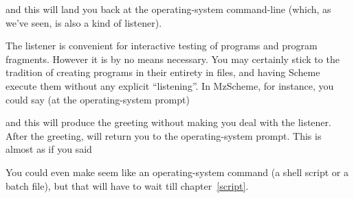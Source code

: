 
\n and this will land you back at the operating-system
command-line (which, as we’ve seen, is also a kind of
listener).

The listener is convenient for interactive testing of
programs and program fragments.  However it is by no
means necessary.  You may certainly stick to the
tradition of creating programs in their entirety in
files, and having Scheme execute them without any
explicit “listening”.  In MzScheme, for instance, you
could say (at the operating-system prompt)


\n and this will produce the greeting without making you
deal with
the listener.   After the greeting,  will
return you to the
operating-system prompt.  This is almost as if you said


You could even make  seem like an
operating-system command (a shell script or a
batch file), but that will have to wait till
chapter~\ref{script}.

\endinput

One way to do this in the Unix version of
MzScheme is to place the following line at the head of
\p{hello.scm}:

\q{
":";exec mzscheme -r $0 $*
}

\n (This assumes your Unix command shell is either the
Bourne shell or \p{bash}.)

Make the file executable by doing \p{chmod +x
hello.scm}, and then simply type

\p{
hello.scm
}

\n at the Unix prompt.
